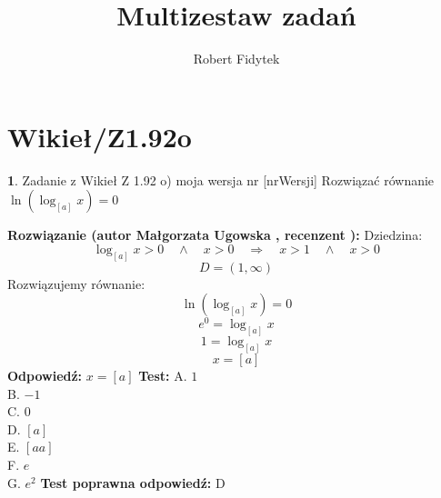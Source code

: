 \documentclass[12pt, a4paper]{article}
\title{Multizestaw zadań}
\author{Robert Fidytek}
\date{}
\theoremstyle{definition} %
\newtheorem{zad}{}
\newcommand{\kategoria}[1]{\section{#1}} %
\newcommand{\zadStart}[1]{\begin{zad}#1\newline} %
\newcommand{\zadStop}{\end{zad}}   %
\newcommand{\rozwStart}[2]{\noindent \textbf{Rozwiązanie (autor #1 , recenzent #2): }\newline} %
\newcommand{\rozwStop}{\newline}                                            %
\newcommand{\odpStart}{\noindent \textbf{Odpowiedź:}\newline}    %
\newcommand{\odpStop}{\newline}                                             %
\newcommand{\testStart}{\noindent \textbf{Test:}\newline} %
\newcommand{\testStop}{\newline} %
\newcommand{\kluczStart}{\noindent \textbf{Test poprawna odpowiedź:}\newline} %
\newcommand{\kluczStop}{\newline} %
\begin{document}
\maketitle


\kategoria{Wikieł/Z1.92o}
\zadStart{Zadanie z Wikieł Z 1.92 o) moja wersja nr [nrWersji]}
Rozwiązać równanie $\ln{(\log_{[a]}{x})}=0$
\zadStop
\rozwStart{Małgorzata Ugowska}{}
Dziedzina:
$$\log_{[a]}{x}>0 \quad \wedge \quad x > 0 \quad \Longrightarrow \quad x>1 \quad \wedge \quad x>0$$
$$D =  (1, \infty)$$
Rozwiązujemy równanie:
$$\ln{(\log_{[a]}{x})}=0$$
$$e^{0}= \log_{[a]}{x}$$
$$1= \log_{[a]}{x}$$
$$x = [a]$$
\rozwStop
\odpStart
$x =[a]$
\odpStop
\testStart
A. $1$\\
B. $-1$\\
C. $0$\\
D. $[a]$\\
E. $[aa]$\\
F. $e$\\
G. $e^2$
\testStop
\kluczStart
D
\kluczStop
\end{document}
